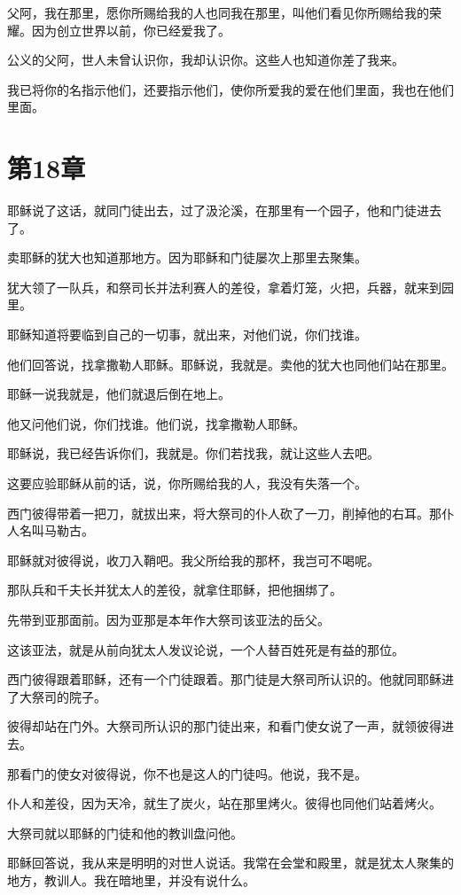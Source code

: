 \documentclass[12pt,oneside]{book}
\begin{document}
父阿，我在那里，愿你所赐给我的人也同我在那里，叫他们看见你所赐给我的荣耀。因为创立世界以前，你已经爱我了。

公义的父阿，世人未曾认识你，我却认识你。这些人也知道你差了我来。

我已将你的名指示他们，还要指示他们，使你所爱我的爱在他们里面，我也在他们里面。

\chapter{第18章}
耶稣说了这话，就同门徒出去，过了汲沦溪，在那里有一个园子，他和门徒进去了。

卖耶稣的犹大也知道那地方。因为耶稣和门徒屡次上那里去聚集。

犹大领了一队兵，和祭司长并法利赛人的差役，拿着灯笼，火把，兵器，就来到园里。

耶稣知道将要临到自己的一切事，就出来，对他们说，你们找谁。

他们回答说，找拿撒勒人耶稣。耶稣说，我就是。卖他的犹大也同他们站在那里。

耶稣一说我就是，他们就退后倒在地上。

他又问他们说，你们找谁。他们说，找拿撒勒人耶稣。

耶稣说，我已经告诉你们，我就是。你们若找我，就让这些人去吧。

这要应验耶稣从前的话，说，你所赐给我的人，我没有失落一个。

西门彼得带着一把刀，就拔出来，将大祭司的仆人砍了一刀，削掉他的右耳。那仆人名叫马勒古。

耶稣就对彼得说，收刀入鞘吧。我父所给我的那杯，我岂可不喝呢。

那队兵和千夫长并犹太人的差役，就拿住耶稣，把他捆绑了。

先带到亚那面前。因为亚那是本年作大祭司该亚法的岳父。

这该亚法，就是从前向犹太人发议论说，一个人替百姓死是有益的那位。

西门彼得跟着耶稣，还有一个门徒跟着。那门徒是大祭司所认识的。他就同耶稣进了大祭司的院子。

彼得却站在门外。大祭司所认识的那门徒出来，和看门使女说了一声，就领彼得进去。

那看门的使女对彼得说，你不也是这人的门徒吗。他说，我不是。

仆人和差役，因为天冷，就生了炭火，站在那里烤火。彼得也同他们站着烤火。

大祭司就以耶稣的门徒和他的教训盘问他。

耶稣回答说，我从来是明明的对世人说话。我常在会堂和殿里，就是犹太人聚集的地方，教训人。我在暗地里，并没有说什么。
\end{document}
